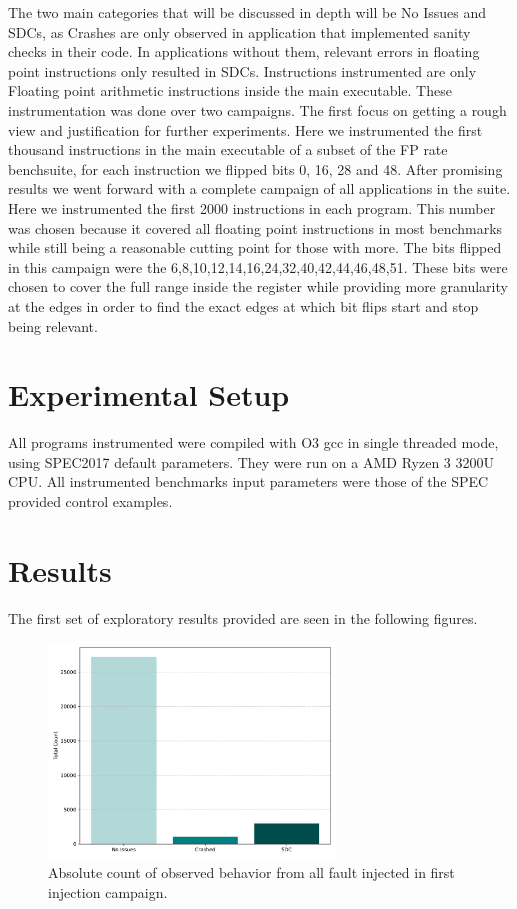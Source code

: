 \documentclass[lettersize,journal]{IEEEtran}
\begin{document}
The two main categories that will be discussed in depth will be No Issues and SDCs, as Crashes are only observed in application that implemented sanity checks in their code. In applications without them, relevant errors in floating point instructions only resulted in SDCs.
Instructions instrumented are only Floating point arithmetic instructions inside the main executable. These instrumentation was done over two campaigns. The first focus on getting a rough view and justification for further experiments. Here we instrumented the first thousand instructions in the main executable of a subset of the FP rate benchsuite, for each instruction we flipped bits 0, 16, 28 and 48. After promising results we went forward with a complete campaign of all applications in the suite. Here we instrumented the first 2000 instructions in each program. This number was chosen because it covered all floating point instructions in most benchmarks while still being a reasonable cutting point for those with more. The bits flipped in this campaign were the 6,8,10,12,14,16,24,32,40,42,44,46,48,51. These bits were chosen to cover the full range inside the register while providing more granularity at the edges in order to find the exact edges at which bit flips start and stop being relevant.
\section{Experimental Setup}
All programs instrumented were compiled with O3 gcc in single threaded mode, using SPEC2017 default parameters. They were run on a AMD Ryzen 3 3200U CPU. All instrumented benchmarks input parameters were those of the SPEC provided control examples. 

\section{Results}
The first set of exploratory results provided are seen in the following figures.

\begin{figure}[!t]
  \centering
  \includegraphics[width=3in]{plots/general_view/general_summary.pdf}
  \caption{Absolute count of observed behavior from all fault injected in first injection campaign.}
  \label{totals}
\end{figure}
\end{document}
